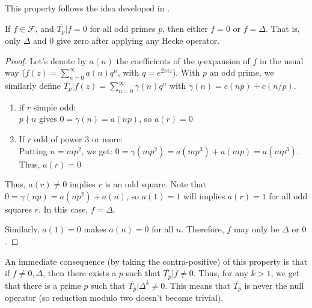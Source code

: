 This property follows the idea developed in \cite[p.33]{TheWebOfModularityArithmeticOfTheCoefficientsOfModularForms}.
\begin{property}
	If $f \in \mathcal{F}$, and $\overline{T_p}|f = 0$ for all odd primes $p$, then either $f = 0$ or $f = \Delta$.
	That is, only $\Delta$ and $0$ give zero after applying any Hecke operator.
\end{property}
\begin{proof}
	Let's denote by $a(n)$ the coefficients of the $q$-expansion of $f$ in the usual way ($f(z) = \sum_{n=0}^{\infty} a(n)q^n$, with $q=e^{2\pi i z}$).
	With $p$ an odd prime, we similarly define $\overline{T_p}|f(z) = \sum_{n=0}^{\infty} \gamma(n)q^n$ with $\gamma(n) = c(np) + c(n/p)$.
	\begin{enumerate}
		\item if $r$ simple odd:\\
		$p \nmid n$ gives $0 = \gamma(n) = a(np)$,
		so $a(r)=0$
		\item If $r$ odd of power 3 or more:\\
		Putting $n=mp^2$, we get: $0 = \gamma(mp^2) = a(mp^3)+a(mp) = a(mp^3)$.\\
		Thus, $a(r)=0$
	\end{enumerate}
	Thus, $a(r) \neq 0$ implies $r$ is an odd square.
	Note that $0 = \gamma(np) = a(np^2) + a(n)$, so $a(1)=1$ will implies $a(r)=1$ for all odd squares $r$.
	In this case, $f = \Delta$.
	
	Similarly, $a(1)=0$ makes $a(n)=0$ for all $n$.
	Therefore, $f$ may only be $\Delta$ or $0$.
\end{proof}

An immediate consequence (by taking the contra-positive) of this property is that if $f \neq 0, \Delta$, then there exists a $p$ such that $\overline{T_p}|f \neq 0$.
Thus, for any $k > 1$, we get that there is a prime $p$ such that $\overline{T_p}|\Delta^k \neq 0$.
This means that $\overline{T_p}$ is never the null operator (so reduction modulo two doesn't become trivial).




